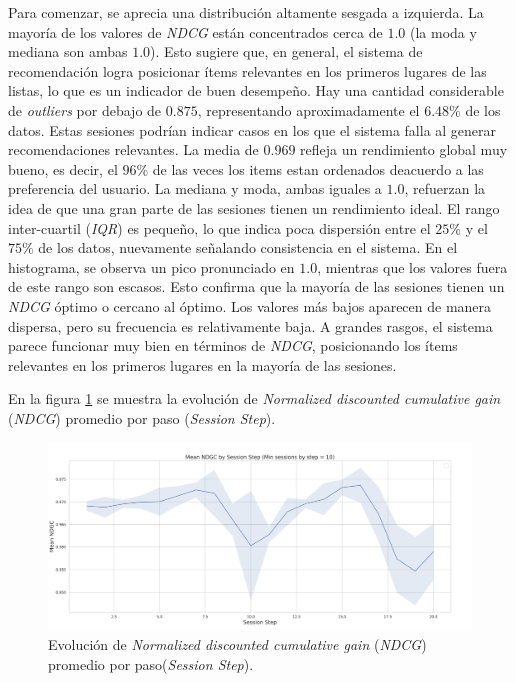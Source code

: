 \documentclass[11pt,a4paper,twoside]{thesis}
\begin{document}
Para comenzar, se aprecia una distribución altamente sesgada a izquierda. La mayoría de los valores de \textit{NDCG} están concentrados cerca de $1.0$ (la moda y mediana son ambas $1.0$). Esto sugiere que, en general, el sistema de recomendación logra posicionar ítems relevantes en los primeros lugares de las listas, lo que es un indicador de buen desempeño. Hay una cantidad considerable de \textit{outliers} por debajo de $0.875$, representando aproximadamente el $6.48\%$ de los datos.
Estas sesiones podrían indicar casos en los que el sistema falla al generar recomendaciones relevantes.
La media de $0.969$ refleja un rendimiento global muy bueno, es decir, el $96\%$ de las veces los items estan ordenados deacuerdo a las preferencia del usuario. La mediana y moda, ambas iguales a $1.0$, refuerzan la idea de que una gran parte de las sesiones tienen un rendimiento ideal. El rango inter-cuartil (\textit{IQR}) es pequeño, lo que indica poca dispersión entre el $25\%$ y el $75\%$ de los datos, nuevamente señalando consistencia en el sistema.
En el histograma, se observa un pico pronunciado en $1.0$, mientras que los valores fuera de este rango son escasos. Esto confirma que la mayoría de las sesiones tienen un \textit{NDCG} óptimo o cercano al óptimo. Los valores más bajos aparecen de manera dispersa, pero su frecuencia es relativamente baja. A grandes rasgos, el sistema parece funcionar muy bien en términos de \textit{NDCG}, posicionando los ítems relevantes en los primeros lugares en la mayoría de las sesiones.
\clearpage


En la figura \ref{fig:llama2-mean_ndgc_by_session_step} se muestra la evolución de \textit{Normalized discounted cumulative gain} (\textit{NDCG}) promedio por paso (\textit{Session Step}).

\begin{figure}[htbp]
	\centering
	\includegraphics[width=15cm]{./images/llama2/mean_ndgc_by_session_step.png}
	\caption{Evolución de \textit{Normalized discounted cumulative gain} (\textit{NDCG}) promedio por paso(\textit{Session Step}).}
	\label{fig:llama2-mean_ndgc_by_session_step}
\end{figure}
\end{document}
